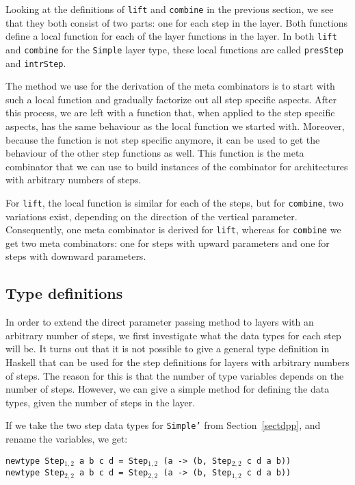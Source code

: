 Looking at the definitions of \texttt{lift} and \texttt{combine} in the previous section, we see that they both consist of two parts: one for each step in the layer. Both functions define a local function for each of the layer functions in the layer. In both \texttt{lift} and \texttt{combine} for the \texttt{Simple} layer type, these local functions are called \texttt{presStep} and \texttt{intrStep}. 

The method we use for the derivation of the meta combinators is to start with such a local function and gradually factorize out all step specific aspects. After this process, we are left with a function that, when applied to the step specific aspects, has the same behaviour as the local function we started with. Moreover, because the function is not step specific anymore, it can be used to get the behaviour of the other step functions as well. This function is the meta combinator that we can use to build instances of the combinator for architectures with arbitrary numbers of steps.

 For \texttt{lift}, the local function is similar for each of the steps, but for \texttt{combine}, two variations exist, depending on the direction of the vertical parameter. Consequently, one meta combinator is derived for \texttt{lift}, whereas for \texttt{combine} we get two meta combinators: one for steps with upward parameters and one for steps with downward parameters.
 
 
%																
\subsection{Type definitions} \label{subsecttypedef}

In order to extend the direct parameter passing method to layers with an arbitrary number of steps, we first investigate what the data types for each step will be. It turns out that it is not possible to give a general type definition in Haskell that can be used for the step definitions for layers with arbitrary numbers of steps. The reason for this is that the number of type variables depends on the number of steps. However, we can give a simple method for defining the data types, given the number of steps in the layer.

If we take the two step data types for \texttt{Simple'} from Section~\ref{sectdpp}, and rename the variables, we get:

{\tt newtype Step$_{1,2}$ a b c d = Step$_{1,2}$ (a -> (b, Step$_{2,2}$ c d a b))}\\
{\tt newtype Step$_{2,2}$ a b c d = Step$_{2,2}$ (a -> (b, Step$_{1,2}$ c d a b))}

